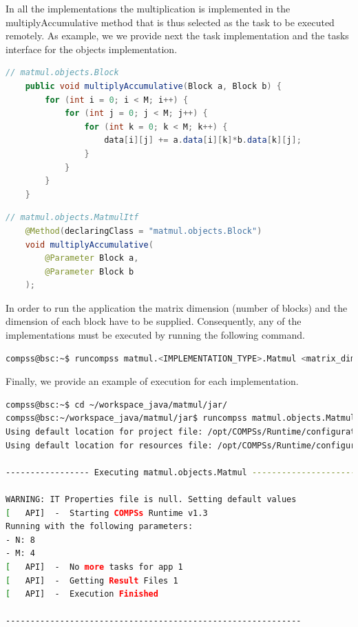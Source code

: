 \newpage 
In all the implementations the multiplication is implemented in the multiplyAccumulative method that is thus selected as the task to be executed remotely.
As example, we we provide next the task implementation and the tasks interface for the objects implementation.

\begin{lstlisting}[language=java]
	// matmul.objects.Block
	public void multiplyAccumulative(Block a, Block b) {
		for (int i = 0; i < M; i++) {
			for (int j = 0; j < M; j++) {
				for (int k = 0; k < M; k++) {
					data[i][j] += a.data[i][k]*b.data[k][j];
				}
			}
		}
	}
\end{lstlisting}

\begin{lstlisting}[language=java]
	// matmul.objects.MatmulItf
	@Method(declaringClass = "matmul.objects.Block")
	void multiplyAccumulative(
		@Parameter Block a,
		@Parameter Block b
	);
\end{lstlisting}

In order to run the application the matrix dimension (number of blocks) and the dimension of each block have to be supplied. Consequently, any of the 
implementations must be executed by running the following command.
\begin{lstlisting}[language=bash]
compss@bsc:~$ runcompss matmul.<IMPLEMENTATION_TYPE>.Matmul <matrix_dim> <block_dim>
\end{lstlisting}

Finally, we provide an example of execution for each implementation.

\begin{lstlisting}[language=bash]
compss@bsc:~$ cd ~/workspace_java/matmul/jar/
compss@bsc:~/workspace_java/matmul/jar$ runcompss matmul.objects.Matmul 8 4
Using default location for project file: /opt/COMPSs/Runtime/configuration/xml/projects/project.xml
Using default location for resources file: /opt/COMPSs/Runtime/configuration/xml/resources/resources.xml

----------------- Executing matmul.objects.Matmul --------------------------

WARNING: IT Properties file is null. Setting default values
[   API]  -  Starting COMPSs Runtime v1.3
Running with the following parameters:
- N: 8
- M: 4
[   API]  -  No more tasks for app 1
[   API]  -  Getting Result Files 1
[   API]  -  Execution Finished

------------------------------------------------------------
\end{lstlisting}

